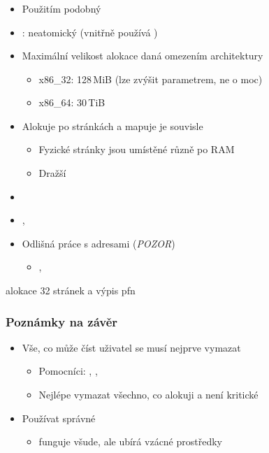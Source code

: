 \begin{frame}
  \frametitle{}

  \begin{itemize}
  \item Použitím podobný 
  \item \pozor: neatomický (vnitřně používá )
  \item Maximální velikost alokace daná omezením architektury
  \begin{itemize}
    \item x86\_32: 128\,MiB (lze zvýšit parametrem, ne o moc)
    \item x86\_64: 30\,TiB
  \end{itemize}

  \pause

  \item Alokuje po stránkách a mapuje je souvisle
  \begin{itemize}
    \item Fyzické stránky jsou umístěné různě po RAM
    \item Dražší
  \end{itemize}

  \pause

  \item {}
  \item {}, 
  \item Odlišná práce s adresami (\emph{POZOR})
  \begin{itemize}
  \item {}, 
  \end{itemize}
  \end{itemize}

  \bigskip
  \pause

   alokace 32 stránek a výpis pfn

\end{frame}

\begin{frame}
  \frametitle{Poznámky na závěr}

  \begin{itemize}
  \item Vše, co může číst uživatel se musí nejprve vymazat
  \begin{itemize}
    \item Pomocníci: , , 
    \item Nejlépe vymazat všechno, co alokuji a není kritické
  \end{itemize}
  \item Používat správné 
  \begin{itemize}
    \item {} funguje všude, ale ubírá vzácné prostředky
  \end{itemize}
  \end{itemize}

\end{frame}

